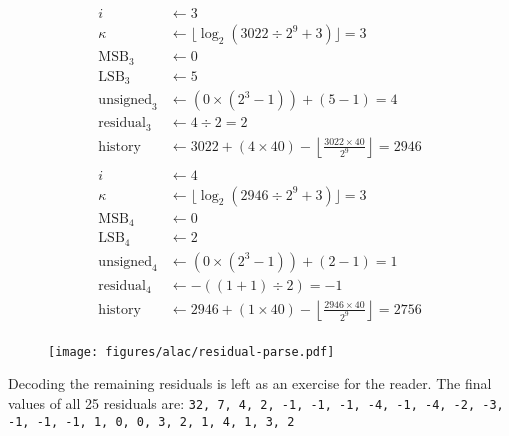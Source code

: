 \clearpage
\begin{align*}
i &\leftarrow 3 \\
\kappa &\leftarrow \lfloor\log_2(3022 \div 2 ^ 9 + 3)\rfloor = 3 \\
\text{MSB}_3 &\leftarrow 0 \\
\text{LSB}_3 &\leftarrow 5 \\
\text{unsigned}_3 &\leftarrow (0 \times (2 ^ 3 - 1)) + (5 - 1) = 4 \\
\text{residual}_3 &\leftarrow 4 \div 2 = 2 \\
\text{history} &\leftarrow 3022 + (4 \times 40) - \left\lfloor\frac{3022 \times 40}{2 ^ 9}\right\rfloor = 2946 \\
\end{align*}
\begin{align*}
i &\leftarrow 4 \\
\kappa &\leftarrow \lfloor\log_2(2946 \div 2 ^ 9 + 3)\rfloor = 3 \\
\text{MSB}_4 &\leftarrow 0 \\
\text{LSB}_4 &\leftarrow 2 \\
\text{unsigned}_4 &\leftarrow (0 \times (2 ^ 3 - 1)) + (2 - 1) = 1 \\
\text{residual}_4 &\leftarrow -((1 + 1) \div 2) = -1 \\
\text{history} &\leftarrow 2946 + (1 \times 40) - \left\lfloor\frac{2946 \times 40}{2 ^ 9}\right\rfloor = 2756 \\
\end{align*}
\begin{figure}[h]
\texttt{[image: figures/alac/residual-parse.pdf]}
\end{figure}
\par
\noindent
Decoding the remaining residuals is left as an exercise for the reader.
The final values of all 25 residuals are:
\texttt{32, 7, 4, 2, -1, -1, -1, -4, -1, -4, -2, -3, -1, -1, -1,
1, 0, 0, 3, 2, 1, 4, 1, 3, 2}





